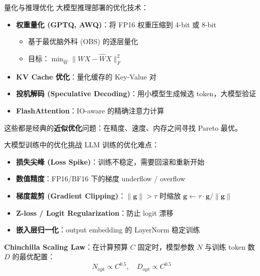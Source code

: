\documentclass[11pt, aspectratio=169, svgnames, table, fontset=fandol]{ctexbeamer}
\begin{document}
\begin{frame}{量化与推理优化}
  大模型推理部署的优化技术：

  \begin{itemize}
    \item \textbf{权重量化 (GPTQ, AWQ)}：将 FP16 权重压缩到 4-bit 或 8-bit
      \begin{itemize}
        \item 基于最优脑外科 (OBS) 的逐层量化
        \item 目标：$\min_{\hat{W}} \|WX - \hat{W}X\|_F^2$
      \end{itemize}
    \item \textbf{KV Cache 优化}：量化缓存的 Key-Value 对
    \item \textbf{投机解码 (Speculative Decoding)}：用小模型生成候选 token，大模型验证
    \item \textbf{FlashAttention}：IO-aware 的精确注意力计算
  \end{itemize}

  \vspace{4pt}
  这些都是经典的\textbf{近似优化}问题：在精度、速度、内存之间寻找 Pareto 最优。
\end{frame}

\begin{frame}{大模型训练中的优化挑战}
  LLM 训练的优化难点：
  \begin{itemize}
    \item \textbf{损失尖峰 (Loss Spike)}：训练不稳定，需要回滚和重新开始
    \item \textbf{数值精度}：FP16/BF16 下的梯度 underflow / overflow
    \item \textbf{梯度裁剪 (Gradient Clipping)}：$\|\bm{g}\| > \tau$ 时缩放 $\bm{g} \leftarrow \tau \cdot \bm{g} / \|\bm{g}\|$
    \item \textbf{Z-loss / Logit Regularization}：防止 logit 漂移
    \item \textbf{嵌入层归一化}：output embedding 的 LayerNorm 稳定训练
  \end{itemize}

  \vspace{6pt}
  \textbf{Chinchilla Scaling Law}：在计算预算 $C$ 固定时，模型参数 $N$ 与训练 token 数 $D$ 的最优配置：
  \begin{equation*}
    N_{\text{opt}} \propto C^{0.5},\quad D_{\text{opt}} \propto C^{0.5}
  \end{equation*}
\end{frame}
\end{document}
